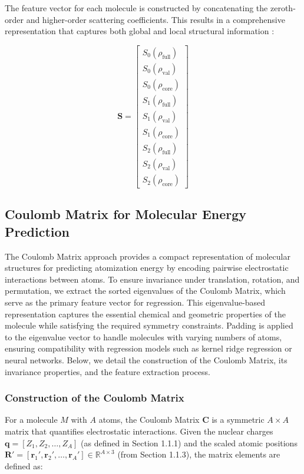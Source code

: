 \documentclass{article}
\begin{document}
The feature vector for each molecule is constructed by concatenating the zeroth-order and higher-order scattering coefficients. This results in a comprehensive representation that captures both global and local structural information : 

\[
\mathbf{S} = \begin{bmatrix}
S_0(\rho_{\text{full}}) \\
S_0(\rho_{\text{val}}) \\
S_0(\rho_{\text{core}}) \\
S_1(\rho_{\text{full}}) \\
S_1(\rho_{\text{val}}) \\
S_1(\rho_{\text{core}}) \\
S_2(\rho_{\text{full}}) \\
S_2(\rho_{\text{val}}) \\
S_2(\rho_{\text{core}})
\end{bmatrix}
\]



\subsection{Coulomb Matrix for Molecular Energy Prediction}

The Coulomb Matrix approach provides a compact representation of molecular structures for predicting atomization energy by encoding pairwise electrostatic interactions between atoms. To ensure invariance under translation, rotation, and permutation, we extract the sorted eigenvalues of the Coulomb Matrix, which serve as the primary feature vector for regression. This eigenvalue-based representation captures the essential chemical and geometric properties of the molecule while satisfying the required symmetry constraints. Padding is applied to the eigenvalue vector to handle molecules with varying numbers of atoms, ensuring compatibility with regression models such as kernel ridge regression or neural networks. Below, we detail the construction of the Coulomb Matrix, its invariance properties, and the feature extraction process.

\subsubsection{Construction of the Coulomb Matrix}

For a molecule \( M \) with \( A \) atoms, the Coulomb Matrix \( \mathbf{C} \) is a symmetric \( A \times A \) matrix that quantifies electrostatic interactions. Given the nuclear charges \( \mathbf{q} = [Z_1, Z_2, \ldots, Z_A] \) (as defined in Section 1.1.1) and the scaled atomic positions \( \mathbf{R}' = [\mathbf{r}_1', \mathbf{r}_2', \ldots, \mathbf{r}_A'] \in \mathbb{R}^{A \times 3} \) (from Section 1.1.3), the matrix elements are defined as:
\end{document}
